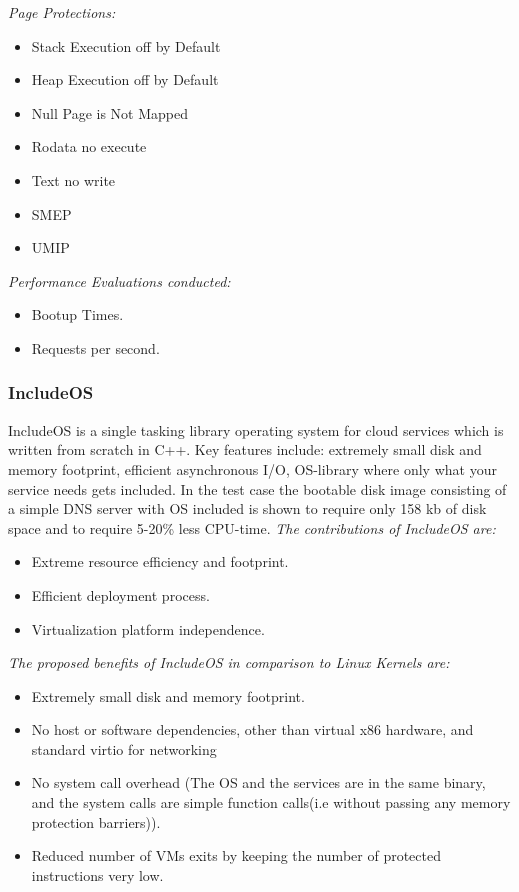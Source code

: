 \emph{Page Protections:}

\begin{itemize}
  \item Stack Execution off by Default
  \item Heap Execution off by Default
  \item Null Page is Not Mapped
  \item Rodata no execute
  \item Text no write
\end{itemize}

\begin{itemize}
  \item SMEP
  \item UMIP
\end{itemize}

\emph{Performance Evaluations conducted:}
\begin{itemize}
  \item Bootup Times.
  \item Requests per second.
\end{itemize}

\subsubsection{IncludeOS \cite{IncludeOS}}
IncludeOS is a single tasking library operating system for 
cloud services which is written from scratch in C++. Key features include:
extremely small disk and memory footprint, efficient asynchronous I/O, 
OS-library where only what your service needs gets included.
In the test case the bootable disk image consisting
of a simple DNS server with OS included is shown
to require only 158 kb of disk space and to require
5-20\% less CPU-time.
\emph{The contributions of IncludeOS are:}
\begin{itemize}
  \item Extreme resource efficiency and footprint.
  \item Efficient deployment process.
  \item Virtualization platform independence.
\end{itemize}
\emph{The proposed benefits of IncludeOS  in comparison to Linux Kernels are:}
\begin{itemize}
  \item Extremely small disk and memory footprint.
  \item No host or software dependencies, other than
  virtual x86 hardware, and standard virtio for
  networking
  \item No system call overhead (The OS and the
  services are in the same binary, and the system calls
  are simple function calls(i.e without passing any
  memory protection barriers)).
  \item Reduced number of VMs exits by keeping the
  number of protected instructions very low.
\end{itemize}

